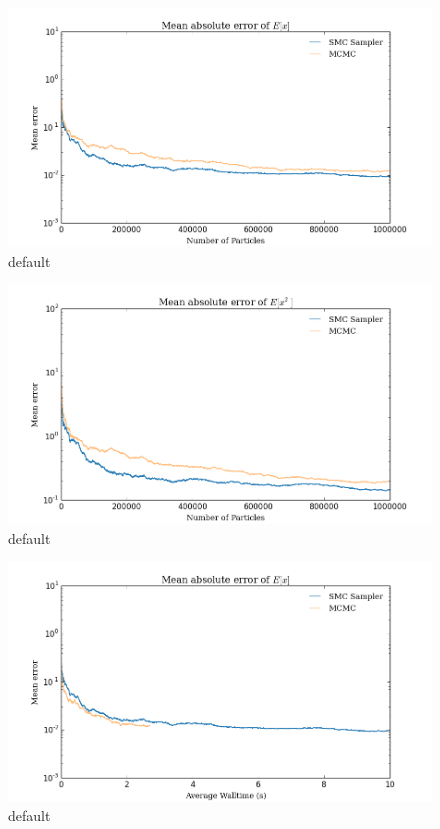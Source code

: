 \documentclass[12pt]{elsarticle}
\begin{document}
\begin{figure}[htbp]
\begin{center}
\includegraphics[width = \textwidth]{plots/E_X.png}
\caption{default}
\label{default}
\end{center}
\end{figure}

\begin{figure}[htbp]
\begin{center}
\includegraphics[width = \textwidth]{plots/E_X2.png}
\caption{default}
\label{default}
\end{center}
\end{figure}

\begin{figure}[htbp]
\begin{center}
\includegraphics[width = \textwidth]{plots/E_X_walltime.png}
\caption{default}
\label{default}
\end{center}
\end{figure}
\end{document}

